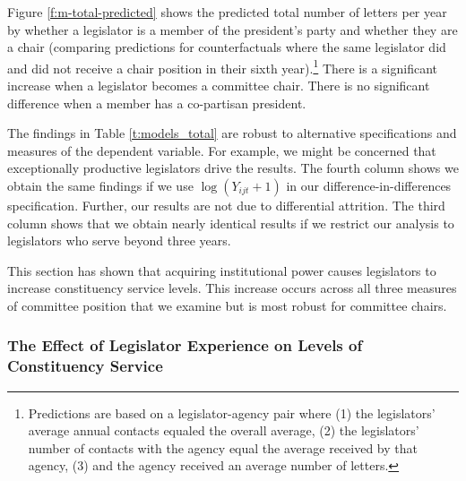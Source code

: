 \documentclass[12pt]{article}
\begin{document}
Figure \ref{f:m-total-predicted} shows the predicted total number of letters per year by whether a legislator is a member of the president's party and whether they are a chair (comparing predictions for counterfactuals where the same legislator did and did not receive a chair position in their sixth year).\footnote{Predictions are based on a legislator-agency pair where (1) the legislators' average annual contacts equaled the overall average, (2) the legislators' number of contacts with the agency equal the average received by that agency, (3) and the agency received an average number of letters.} 
There is a significant increase when a legislator becomes a committee chair. There is no significant difference when a member has a co-partisan president.

The findings in Table \ref{t:models_total} are robust to alternative specifications and measures of the dependent variable. For example, we might be concerned that exceptionally productive legislators drive the results. The fourth column shows we obtain the same findings if we use $\log (Y_{ijt} + 1)$ in our difference-in-differences specification. Further, our results are not due to differential attrition. The third column shows that we obtain nearly identical results if we restrict our analysis to legislators who serve beyond three years.    

This section has shown that acquiring institutional power causes legislators to increase constituency service levels. This increase occurs across all three measures of committee position that we examine but is most robust for committee chairs. 


\subsubsection{The Effect of Legislator Experience on Levels of Constituency Service}\label{s:tenure} 

\end{document}
